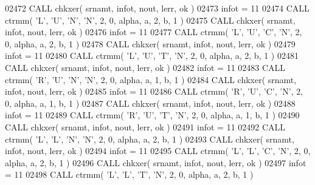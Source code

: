 \begin{DoxyCode}
02472       \textcolor{keyword}{CALL }chkxer( srnamt, infot, nout, lerr, ok )
02473       infot = 11
02474       \textcolor{keyword}{CALL }ctrmm( \textcolor{stringliteral}{'L'}, \textcolor{stringliteral}{'U'}, \textcolor{stringliteral}{'N'}, \textcolor{stringliteral}{'N'}, 2, 0, alpha, a, 2, b, 1 )
02475       \textcolor{keyword}{CALL }chkxer( srnamt, infot, nout, lerr, ok )
02476       infot = 11
02477       \textcolor{keyword}{CALL }ctrmm( \textcolor{stringliteral}{'L'}, \textcolor{stringliteral}{'U'}, \textcolor{stringliteral}{'C'}, \textcolor{stringliteral}{'N'}, 2, 0, alpha, a, 2, b, 1 )
02478       \textcolor{keyword}{CALL }chkxer( srnamt, infot, nout, lerr, ok )
02479       infot = 11
02480       \textcolor{keyword}{CALL }ctrmm( \textcolor{stringliteral}{'L'}, \textcolor{stringliteral}{'U'}, \textcolor{stringliteral}{'T'}, \textcolor{stringliteral}{'N'}, 2, 0, alpha, a, 2, b, 1 )
02481       \textcolor{keyword}{CALL }chkxer( srnamt, infot, nout, lerr, ok )
02482       infot = 11
02483       \textcolor{keyword}{CALL }ctrmm( \textcolor{stringliteral}{'R'}, \textcolor{stringliteral}{'U'}, \textcolor{stringliteral}{'N'}, \textcolor{stringliteral}{'N'}, 2, 0, alpha, a, 1, b, 1 )
02484       \textcolor{keyword}{CALL }chkxer( srnamt, infot, nout, lerr, ok )
02485       infot = 11
02486       \textcolor{keyword}{CALL }ctrmm( \textcolor{stringliteral}{'R'}, \textcolor{stringliteral}{'U'}, \textcolor{stringliteral}{'C'}, \textcolor{stringliteral}{'N'}, 2, 0, alpha, a, 1, b, 1 )
02487       \textcolor{keyword}{CALL }chkxer( srnamt, infot, nout, lerr, ok )
02488       infot = 11
02489       \textcolor{keyword}{CALL }ctrmm( \textcolor{stringliteral}{'R'}, \textcolor{stringliteral}{'U'}, \textcolor{stringliteral}{'T'}, \textcolor{stringliteral}{'N'}, 2, 0, alpha, a, 1, b, 1 )
02490       \textcolor{keyword}{CALL }chkxer( srnamt, infot, nout, lerr, ok )
02491       infot = 11
02492       \textcolor{keyword}{CALL }ctrmm( \textcolor{stringliteral}{'L'}, \textcolor{stringliteral}{'L'}, \textcolor{stringliteral}{'N'}, \textcolor{stringliteral}{'N'}, 2, 0, alpha, a, 2, b, 1 )
02493       \textcolor{keyword}{CALL }chkxer( srnamt, infot, nout, lerr, ok )
02494       infot = 11
02495       \textcolor{keyword}{CALL }ctrmm( \textcolor{stringliteral}{'L'}, \textcolor{stringliteral}{'L'}, \textcolor{stringliteral}{'C'}, \textcolor{stringliteral}{'N'}, 2, 0, alpha, a, 2, b, 1 )
02496       \textcolor{keyword}{CALL }chkxer( srnamt, infot, nout, lerr, ok )
02497       infot = 11
02498       \textcolor{keyword}{CALL }ctrmm( \textcolor{stringliteral}{'L'}, \textcolor{stringliteral}{'L'}, \textcolor{stringliteral}{'T'}, \textcolor{stringliteral}{'N'}, 2, 0, alpha, a, 2, b, 1 )

\end{DoxyCode}
